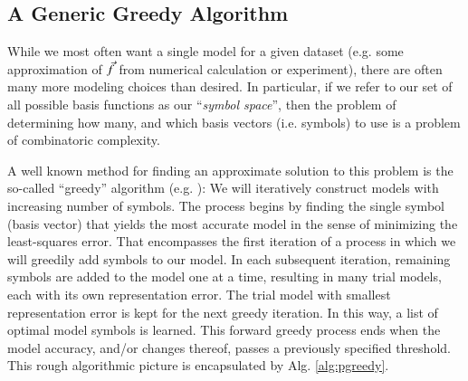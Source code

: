 \documentclass[twocolumn,aps,prd,floatfix,preprintnumbers,a4paper,nofootinbib,
superscriptaddress,10pt]{revtex4-1}
\begin{document}
\subsection{A Generic Greedy Algorithm}
%
While we most often want a single model for a given dataset (e.g. some approximation of $\vec{f}$ from numerical calculation or experiment), there are often many more modeling choices than desired.
%
In particular, if we refer to our set of all possible basis functions as our ``\textit{symbol space}'', then the problem of determining how many, and which basis vectors (i.e. symbols) to use is a problem of combinatoric complexity.
%
\par A well known method for finding an approximate solution to this problem is the so-called ``greedy'' algorithm (e.g. \cite{Field:2011mf, GVK022791892}):
%
We will iteratively construct models with increasing number of symbols.
%
The process begins by finding the single symbol (basis vector) that yields the most accurate model in the sense of minimizing the least-squares error.
%
That encompasses the first iteration of a process in which we will greedily add symbols to our model.
%
In each subsequent iteration, remaining symbols are added to the model one at a time, resulting in many trial models, each with its own representation error.
%
The trial model with smallest representation error is kept for the next greedy iteration.
%
In this way, a list of optimal model symbols is learned.
%
This forward greedy process ends when the model accuracy, and/or changes thereof, passes a previously specified threshold.
%
This rough algorithmic picture is encapsulated by Alg. \ref{alg:pgreedy}.
%
\hspace{1cm}
\end{document}
